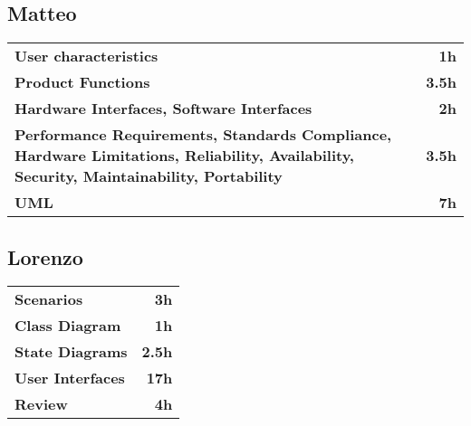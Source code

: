 \subsection*{Matteo}
\begin{table}[H]
    \begin{tabular}{lr}
        \toprule
        \textbf{User characteristics}                                                                                                                    & \textbf{1h}   \\
        \textbf{Product Functions}                                                                                                                       & \textbf{3.5h} \\
        \textbf{Hardware Interfaces, Software Interfaces}                                                                                                & \textbf{2h}   \\
        \textbf{Performance Requirements, Standards Compliance, Hardware Limitations, Reliability, Availability, Security, Maintainability, Portability} & \textbf{3.5h} \\
        \textbf{UML}                                                                                                                                     & \textbf{7h}   \\
        \bottomrule
    \end{tabular}
\end{table}

\subsection*{Lorenzo}
\begin{table}[H]
    \begin{tabular}{lr}
        \toprule
        \textbf{Scenarios}       & \textbf{3h}   \\
        \textbf{Class Diagram}   & \textbf{1h}   \\
        \textbf{State Diagrams}  & \textbf{2.5h} \\
        \textbf{User Interfaces} & \textbf{17h}  \\
        \textbf{Review}          & \textbf{4h}   \\
        \bottomrule
    \end{tabular}
\end{table}
